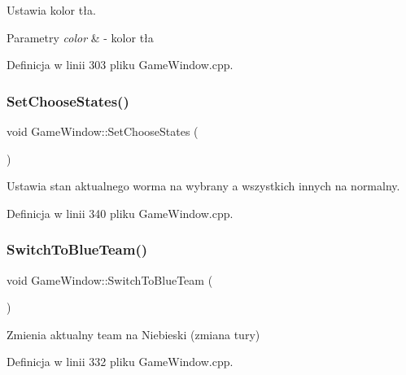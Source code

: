 Ustawia kolor tła. 


\begin{DoxyParams}{Parametry}
{\em color} & -\/ kolor tła \\
\hline
\end{DoxyParams}


Definicja w linii 303 pliku Game\+Window.\+cpp.

\mbox{\label{class_game_window_a24b9dd0b93ad629da3b2e15661fdea0c}} 
\subsubsection{\texorpdfstring{Set\+Choose\+States()}{SetChooseStates()}}
{\footnotesize\ttfamily void Game\+Window\+::\+Set\+Choose\+States (\begin{DoxyParamCaption}{ }\end{DoxyParamCaption})}



Ustawia stan aktualnego worma na wybrany a wszystkich innych na normalny. 



Definicja w linii 340 pliku Game\+Window.\+cpp.

\mbox{\label{class_game_window_aa7c5976b188b842fc2ce45190b55bdfa}} 
\subsubsection{\texorpdfstring{Switch\+To\+Blue\+Team()}{SwitchToBlueTeam()}}
{\footnotesize\ttfamily void Game\+Window\+::\+Switch\+To\+Blue\+Team (\begin{DoxyParamCaption}{ }\end{DoxyParamCaption})}



Zmienia aktualny team na Niebieski (zmiana tury) 



Definicja w linii 332 pliku Game\+Window.\+cpp.

\mbox{\label{class_game_window_a735db6bd1918401c3b36502d14c8fd7b}} 

